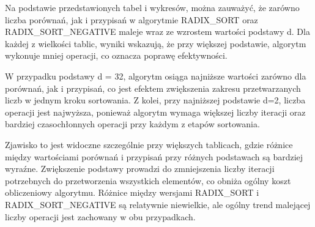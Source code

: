\documentclass{article}
\theoremstyle{definition}
\begin{document}
		Na podstawie przedstawionych tabel i wykresów, można zauważyć, że zarówno liczba porównań, jak i przypisań w algorytmie RADIX\_SORT oraz RADIX\_SORT\_NEGATIVE maleje wraz ze wzrostem wartości podstawy d. Dla każdej z wielkości tablic, wyniki wskazują, że przy większej podstawie, algorytm wykonuje mniej operacji, co oznacza poprawę efektywności.
		
		W przypadku podstawy d = 32, algorytm osiąga najniższe wartości zarówno dla porównań, jak i przypisań, co jest efektem zwiększenia zakresu przetwarzanych liczb w jednym kroku sortowania. Z kolei, przy najniższej podstawie d=2, liczba operacji jest najwyższa, ponieważ algorytm wymaga większej liczby iteracji oraz bardziej czasochłonnych operacji przy każdym z etapów sortowania.

		Zjawisko to jest widoczne szczególnie przy większych tablicach, gdzie różnice między wartościami porównań i przypisań przy różnych podstawach są bardziej wyraźne. Zwiększenie podstawy prowadzi do zmniejszenia liczby iteracji potrzebnych do przetworzenia wszystkich elementów, co obniża ogólny koszt obliczeniowy algorytmu. Różnice między wersjami RADIX\_SORT i RADIX\_SORT\_NEGATIVE są relatywnie niewielkie, ale ogólny trend malejącej liczby operacji jest zachowany w obu przypadkach.
		
\end{document}
